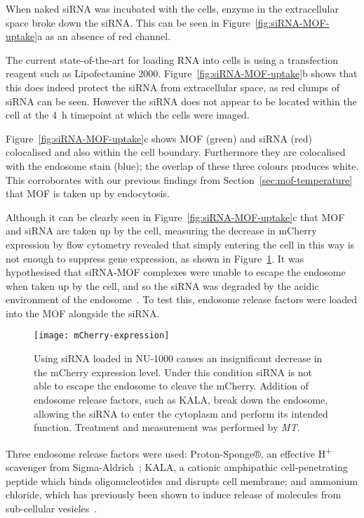 When naked siRNA was incubated with the cells, enzyme in the extracellular space broke down the siRNA. 
This can be seen in Figure~\ref{fig:siRNA-MOF-uptake}a as an absence of red channel. 

The current state-of-the-art for loading RNA into cells is using a transfection reagent such as Lipofectamine 2000. 
Figure~\ref{fig:siRNA-MOF-uptake}b shows that this does indeed protect the siRNA from extracellular space, as red clumps of siRNA can be seen. 
However the siRNA does not appear to be located within the cell at the \SI{4}{\hour} timepoint at which the cells were imaged. 

Figure~\ref{fig:siRNA-MOF-uptake}c shows MOF (green) and siRNA (red) colocalised and also within the cell boundary. 
Furthermore they are colocalised with the endosome stain (blue); the overlap of these three colours produces white. 
This corroborates with our previous findings from Section~\ref{sec:mof-temperature} that MOF is taken up by endocytosis. 

Although it can be clearly seen in Figure~\ref{fig:siRNA-MOF-uptake}c that MOF and siRNA are taken up by the cell, measuring the decrease in mCherry expression by flow cytometry revealed that simply entering the cell in this way is not enough to suppress gene expression, as shown in Figure~\ref{fig:mCherry-expression}. 
It was hypothesised that siRNA-MOF complexes were unable to escape the endosome when taken up by the cell, and so the siRNA was degraded by the acidic environment of the endosome~\cite{geisow1984ph}. 
To test this, endosome release factors were loaded into the MOF alongside the siRNA. 

\begin{figure}[htbp!]
\centering
\texttt{[image: mCherry-expression]}
\caption[MOFs: siRNA suppresses mCherry expression when an endosome release factor is loaded to MOFs]{ Using siRNA loaded in NU-1000 causes an insignificant decrease in the mCherry expression level. Under this condition siRNA is not able to escape the endosome to cleave the mCherry. Addition of endosome release factors, such as KALA, break down the endosome, allowing the siRNA to enter the cytoplasm and perform its intended function. Treatment and measurement was performed by \textit{MT}. }
\label{fig:mCherry-expression}
\end{figure}

Three endosome release factors were used: Proton-Sponge®, an effective H\textsuperscript{+} scavenger from Sigma-Aldrich~\cite{ozkar2002nanocluster}; KALA, a cationic amphipathic cell-penetrating peptide which binds oligonucleotides and disrupts cell membrane; and ammonium chloride, which has previously been shown to induce release of molecules from sub-cellular vesicles~\cite{cervia2017distinct}. 

